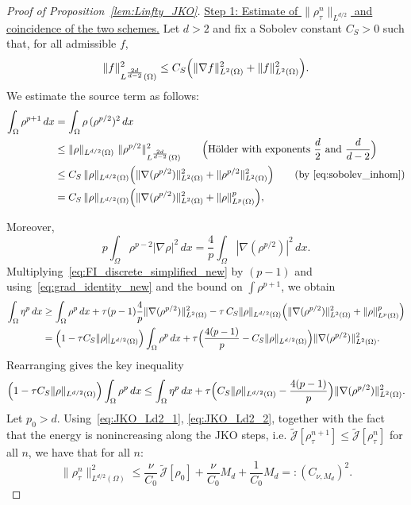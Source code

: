 \documentclass[a4paper,twosided, 11pt]{article}
\theoremstyle{plain}
\theoremstyle{remark}
\numberwithin{equation}{section}
\begin{document}
{\begin{proof}[Proof of Proposition~\ref{lem:Linfty_JKO}]
\medskip
\underline{Step 1: Estimate of $\|\rho_\tau^n\|_{L^{d/2}}$ and coincidence of the two schemes.}
Let $d>2$ and fix a Sobolev constant $C_S>0$ such that, for all admissible $f$,
\begin{equation}\label{eq:sobolev_inhom}
\|f\|_{L^{\frac{2d}{d-2}}(\Omega)}^2
\le C_S\Bigl(\|\nabla f\|_{L^2(\Omega)}^2+\|f\|_{L^2(\Omega)}^2\Bigr).
\end{equation}
We estimate the source term as follows:
\begin{align*}
\int_\Omega \rho^{p+1}\,dx
&=\int_\Omega \rho\,(\rho^{p/2})^2\,dx\\
&\le \|\rho\|_{L^{d/2}(\Omega)}\ \|\rho^{p/2}\|_{L^{\frac{2d}{d-2}}(\Omega)}^2
\qquad\text{\Big(H\"older with exponents $\frac d2$ and $\frac{d}{d-2}$\Big)}\\
&\le C_S\,\|\rho\|_{L^{d/2}(\Omega)}
\Bigl(\|\nabla(\rho^{p/2})\|_{L^2(\Omega)}^2+\|\rho^{p/2}\|_{L^2(\Omega)}^2\Bigr)
\qquad\text{(by~\eqref{eq:sobolev_inhom})}\\
&= C_S\,\|\rho\|_{L^{d/2}(\Omega)}
\Bigl(\|\nabla(\rho^{p/2})\|_{L^2(\Omega)}^2+\|\rho\|_{L^p(\Omega)}^p\Bigr),
\end{align*}

Moreover,
\begin{equation}\label{eq:grad_identity_new}
p\int_\Omega \rho^{p-2}|\nabla\rho|^2\,dx
=\frac{4}{p}\int_\Omega |\nabla(\rho^{p/2})|^2\,dx.
\end{equation}
Multiplying~\eqref{eq:FI_discrete_simplified_new} by $(p-1)$ and using~\eqref{eq:grad_identity_new} and the bound on
$\int\rho^{p+1}$, we obtain
\begin{align*}
\int_\Omega \eta^p\,dx
&\ge \int_\Omega \rho^p\,dx
+\tau (p-1)\frac{4}{p}\|\nabla(\rho^{p/2})\|_{L^2(\Omega)}^2
-\tau\,C_S\|\rho\|_{L^{d/2}(\Omega)}
\Bigl(\|\nabla(\rho^{p/2})\|_{L^2(\Omega)}^2+\|\rho\|_{L^p(\Omega)}^p\Bigr)\\
&=\Bigl(1-\tau C_S\|\rho\|_{L^{d/2}(\Omega)}\Bigr)\int_\Omega \rho^p\,dx
+\tau\Bigl(\frac{4(p-1)}{p}-C_S\|\rho\|_{L^{d/2}(\Omega)}\Bigr)\|\nabla(\rho^{p/2})\|_{L^2(\Omega)}^2.
\end{align*}
Rearranging gives the key inequality
\begin{equation}\label{eq:FI_discrete2_new}
\Bigl(1-\tau C_S\|\rho\|_{L^{d/2}(\Omega)}\Bigr)\int_\Omega \rho^p\,dx
\le
\int_\Omega \eta^p\,dx
+\tau\Bigl(C_S\|\rho\|_{L^{d/2}(\Omega)}-\frac{4(p-1)}{p}\Bigr)\|\nabla(\rho^{p/2})\|_{L^2(\Omega)}^2.
\end{equation}
Let $p_0>d$. Using~\eqref{eq:JKO_Ld2_1}, \eqref{eq:JKO_Ld2_2}, together with the fact that the energy is nonincreasing along the JKO steps, i.e. $\widetilde{\mathcal{J}}[\rho_\tau^{n+1}]\le\widetilde{\mathcal{J}}[\rho_\tau^{n}]$ for all $n$, we have that for all $n$:
\begin{equation}\label{eq:Ld2_apriori_new}
\|\rho_\tau^{n}\|_{L^{d/2}(\Omega)}^2
\le
\frac{\nu}{C_0}\,\widetilde{\mathcal J}[\rho_0]+\frac{\nu}{C_0}M_d+\frac{1}{C_0}M_d
=:(C_{\nu,M_d})^2.
\end{equation}



\end{proof}}
\end{document}
